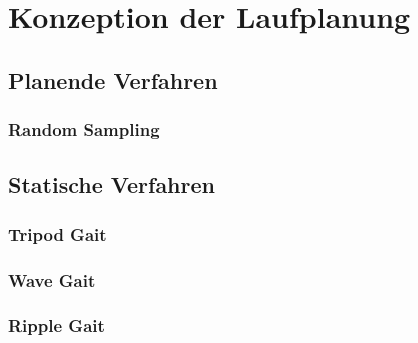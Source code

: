 \chapter{Konzeption der Laufplanung}

\section{Planende Verfahren}

\subsection{Random Sampling}

\section{Statische Verfahren}

\subsection{Tripod Gait}
\subsection{Wave Gait}
\subsection{Ripple Gait}